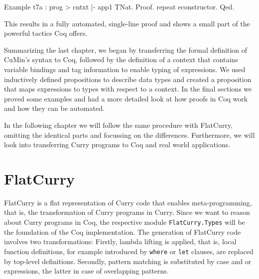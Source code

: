 \documentclass[fleqn]{scrreprt}
\newcommand{\todo}[1]{\marginpar{\textbf{TODO:} #1}}
\begin{document}
\begin{coqcode}
Example t7a : prog > cntxt |- app1 \in TNat.
Proof.
  repeat econstructor.
Qed.
\end{coqcode}
This results in a fully automated, single-line proof and shows a small part of the powerful tactics Coq offers.
\par
Summarizing the last chapter, we began by transferring the formal definition of CuMin's syntax to Coq, followed by the definition of a context that contains variable bindings and tag information to enable typing of expressions. We used inductively defined propositions to describe data types and created a proposition that maps expressions to types with respect to a context. In the final sections we proved some examples and had a more detailed look at how proofs in Coq work and how they can be automated.
\par
In the following chapter we will follow the same procedure with FlatCurry, omitting the identical parts and focussing on the differences. Furthermore, we will look into transferring Curry programs to Coq and real world applications.
\chapter{FlatCurry}
FlatCurry is a flat representation of Curry code that enables meta-programming, that is, the transformation of Curry programs in Curry.\cite{kics2manual} Since we want to reason about Curry programs in Coq, the respective module \texttt{FlatCurry.Types} will be the foundation of the Coq implementation. The generation of FlatCurry code involves two transformations: Firstly, lambda lifting is applied, that is, local function definitions, for example introduced by \texttt{where} or \texttt{let} clauses, are replaced by top-level definitions. Secondly, pattern matching is substituted by case and or expressions, the latter in case of overlapping patterns.
\par
\todo{Kapitelüberblick}
\end{document}
